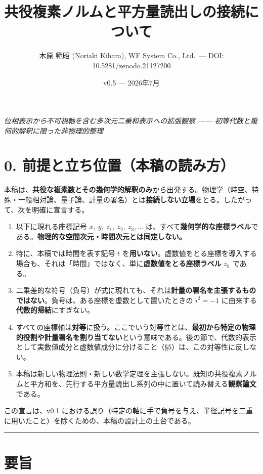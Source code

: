 \documentclass[11pt,a4paper]{ltjsarticle}
\title{共役複素ノルムと平方量読出しの接続について}
\author{木原 範昭 (Noriaki Kihara), WF System Co., Ltd.~--- DOI:
10.5281/zenodo.21127200}
\date{v0.5 --- 2026年7月}
\providecommand{\tightlist}{\setlength{\itemsep}{0pt}\setlength{\parskip}{0pt}}
\begin{document}
\maketitle
\emph{位相表示から不可視軸を含む多次元二乗和表示への拡張観察 ------
初等代数と幾何的解釈に限った非物理的整理}

\section{0.
前提と立ち位置（本稿の読み方）}\label{ux524dux63d0ux3068ux7acbux3061ux4f4dux7f6eux672cux7a3fux306eux8aadux307fux65b9}

本稿は、\textbf{共役な複素数とその幾何学的解釈のみ}から出発する。物理学（時空、特殊・一般相対論、量子論、計量の署名）とは\textbf{接続しない立場}をとる。したがって、次を明確に宣言する。

\begin{enumerate}
\def\labelenumi{\arabic{enumi}.}
\tightlist
\item
  以下に現れる座標記号 \(x,\ y,\ z_1,\ z_2,\ z_3,\dots\)
  は、すべて\textbf{幾何学的な座標ラベル}である。\textbf{物理的な空間次元・時間次元とは同定しない。}
\item
  特に、本稿では時間を表す記号 \(t\)
  を\textbf{用いない}。虚数値をとる座標を導入する場合も、それは「時間」ではなく、単に\textbf{虚数値をとる座標ラベル}
  \(z_h\) である。
\item
  二乗差的な符号（負号）が式に現れても、それは\textbf{計量の署名を主張するものではない}。負号は、ある座標を虚数として置いたときの
  \(i^2=-1\) に由来する\textbf{代数的帰結}にすぎない。
\item
  すべての座標軸は\textbf{対等}に扱う。ここでいう対等性とは、\textbf{最初から特定の物理的役割や計量署名を割り当てない}という意味である。後の節で、代数的表示として実数値成分と虚数値成分に分けること（§5）は、この対等性に反しない。
\item
  本稿は新しい物理法則・新しい数学定理を主張しない。既知の共役複素ノルムと平方和を、先行する平方量読出し系列の中に置いて読み替える\textbf{観察論文}である。
\end{enumerate}

この宣言は、v0.1
における誤り（特定の軸に手で負号を与え、半径記号を二重に用いたこと）を除くための、本稿の設計上の土台である。

\begin{center}\rule{0.5\linewidth}{0.5pt}\end{center}

\section{要旨}\label{ux8981ux65e8}
\end{document}
